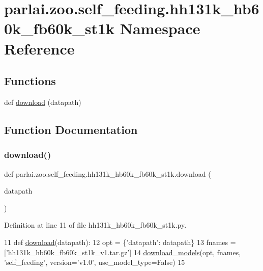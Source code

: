 \hypertarget{namespaceparlai_1_1zoo_1_1self__feeding_1_1hh131k__hb60k__fb60k__st1k}{}\section{parlai.\+zoo.\+self\+\_\+feeding.\+hh131k\+\_\+hb60k\+\_\+fb60k\+\_\+st1k Namespace Reference}
\label{namespaceparlai_1_1zoo_1_1self__feeding_1_1hh131k__hb60k__fb60k__st1k}
\subsection*{Functions}
\begin{DoxyCompactItemize}
\item 
def \hyperlink{namespaceparlai_1_1zoo_1_1self__feeding_1_1hh131k__hb60k__fb60k__st1k_a5e051a30e8d35df6f02340333024100b}{download} (datapath)
\end{DoxyCompactItemize}


\subsection{Function Documentation}
\mbox{\label{namespaceparlai_1_1zoo_1_1self__feeding_1_1hh131k__hb60k__fb60k__st1k_a5e051a30e8d35df6f02340333024100b}} 
\subsubsection{\texorpdfstring{download()}{download()}}
{\footnotesize\ttfamily def parlai.\+zoo.\+self\+\_\+feeding.\+hh131k\+\_\+hb60k\+\_\+fb60k\+\_\+st1k.\+download (\begin{DoxyParamCaption}\item[{}]{datapath }\end{DoxyParamCaption})}



Definition at line 11 of file hh131k\+\_\+hb60k\+\_\+fb60k\+\_\+st1k.\+py.


\begin{DoxyCode}
11 \textcolor{keyword}{def }\hyperlink{namespaceparlai_1_1zoo_1_1self__feeding_1_1hh131k__hb60k__fb60k__st1k_a5e051a30e8d35df6f02340333024100b}{download}(datapath):
12     opt = \{\textcolor{stringliteral}{'datapath'}: datapath\}
13     fnames = [\textcolor{stringliteral}{'hh131k\_hb60k\_fb60k\_st1k\_v1.tar.gz'}]
14     \hyperlink{namespaceparlai_1_1core_1_1build__data_ab697f23f05d3e36d7979fe5e0ed7911e}{download\_models}(opt, fnames, \textcolor{stringliteral}{'self\_feeding'}, version=\textcolor{stringliteral}{'v1.0'}, use\_model\_type=\textcolor{keyword}{False})
15 \end{DoxyCode}
